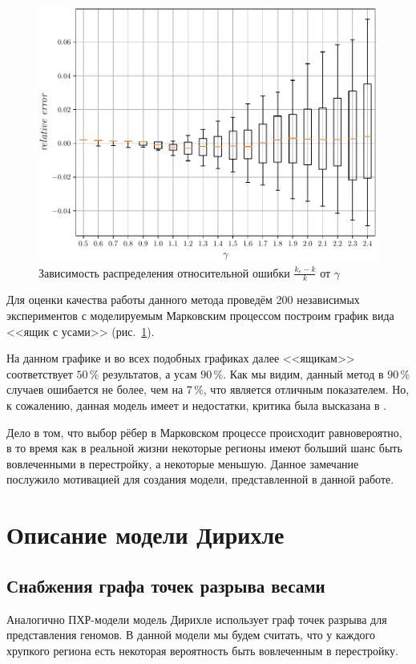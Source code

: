 \begin{figure}[h!]
    \includegraphics[width=.8\linewidth]{img/classic_est_error.pdf}
    \caption{Зависимость распределения относительной ошибки $\frac {k_e - k} k$ от $\gamma$ }
    \label{classic-est-error}
\end{figure}
Для оценки качества работы данного метода проведём 200 независимых экспериментов с моделируемым Марковским процессом построим график вида <<ящик с усами>> (рис.~\ref{classic-est-error}).

На данном графике и во всех подобных графиках далее <<ящикам>> соответствует $50 \, \%$ результатов, а усам $90 \, \%$.
Как мы видим, данный метод в $90 \, \%$ случаев ошибается не более, чем на $7 \, \%$, что является отличным показателем.
Но, к сожалению, данная модель имеет и недостатки, критика была высказана в \cite{fr-4}.

Дело в том, что выбор рёбер в Марковском процессе происходит равновероятно, в то время как в реальной жизни некоторые регионы имеют больший шанс быть вовлеченными в перестройку, а некоторые меньшую.
Данное замечание послужило мотивацией для создания модели, представленной  в данной работе.

\section{Описание модели Дирихле}

\subsection{Снабжения графа точек разрыва весами}
Аналогично ПХР-модели модель Дирихле использует граф точек разрыва для представления геномов.
В данной модели мы будем считать, что у каждого хрупкого региона есть некоторая вероятность быть вовлеченным в перестройку.


